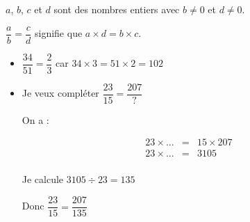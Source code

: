 \begin{myprop}
	$a$, $b$, $c$ et $d$  sont des nombres entiers avec $b \neq 0$ et $ d \neq 0$.
	
	$\dfrac{a}{b} = \dfrac{c}{d}$ signifie que $a \times d = b \times c$.
	
	 
\end{myprop}


\begin{myexs}
	\begin{itemize}
		\item $\dfrac{34}{51} = \dfrac{2}{3}$ car $34 \times 3 = 51 \times 2 = 102$
		
		\item Je veux compléter $\dfrac{23}{15} = \dfrac{207}{?}$
		
		On a :
		
		\begin{eqnarray*}
			23 \times ... &=& 15 \times 207 \\
			23 \times ... &=& \num{3105} \\
		\end{eqnarray*}
		
		Je calcule $\num{3105} \div 23 = 135$
		
		Donc $\dfrac{23}{15} = \dfrac{207}{135}$
	\end{itemize}
	
\end{myexs}
